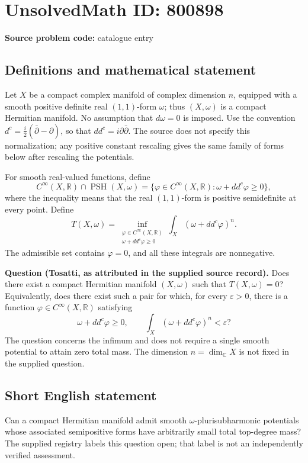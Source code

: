 \documentclass[11pt]{article}
\newcommand{\R}{\mathbb{R}}
\newcommand{\C}{\mathbb{C}}
\begin{document}
\section*{UnsolvedMath ID: 800898}
\textbf{Source problem code:} catalogue entry
\subsection{Definitions and mathematical statement}
Let \(X\) be a compact complex manifold of complex dimension \(n\), equipped with a smooth positive definite real \((1,1)\)-form \(\omega\); thus \((X,\omega)\) is a compact Hermitian manifold. No assumption that \(d\omega=0\) is imposed. Use the convention \(d^c=\frac{i}{2}(\bar\partial-\partial)\), so that \(dd^c=i\partial\bar\partial\). The source does not specify this normalization; any positive constant rescaling gives the same family of forms below after rescaling the potentials.

For smooth real-valued functions, define
\[
C^\infty(X,\R)\cap\operatorname{PSH}(X,\omega)
=\{\varphi\in C^\infty(X,\R):\omega+dd^c\varphi\geq 0\},
\]
where the inequality means that the real \((1,1)\)-form is positive semidefinite at every point. Define
\[
T(X,\omega)=\inf_{\substack{\varphi\in C^\infty(X,\R)\\\omega+dd^c\varphi\geq0}}
\int_X(\omega+dd^c\varphi)^n.
\]
The admissible set contains \(\varphi=0\), and all these integrals are nonnegative.

\textbf{Question (Tosatti, as attributed in the supplied source record).} Does there exist a compact Hermitian manifold \((X,\omega)\) such that \(T(X,\omega)=0\)? Equivalently, does there exist such a pair for which, for every \(\varepsilon>0\), there is a function \(\varphi\in C^\infty(X,\R)\) satisfying
\[
\omega+dd^c\varphi\geq0,
\qquad
\int_X(\omega+dd^c\varphi)^n<\varepsilon?
\]
The question concerns the infimum and does not require a single smooth potential to attain zero total mass. The dimension \(n=\dim_{\C}X\) is not fixed in the supplied question.
\subsection{Short English statement}
Can a compact Hermitian manifold admit smooth \(\omega\)-plurisubharmonic potentials whose associated semipositive forms have arbitrarily small total top-degree mass? The supplied registry labels this question open; that label is not an independently verified assessment.
\end{document}
